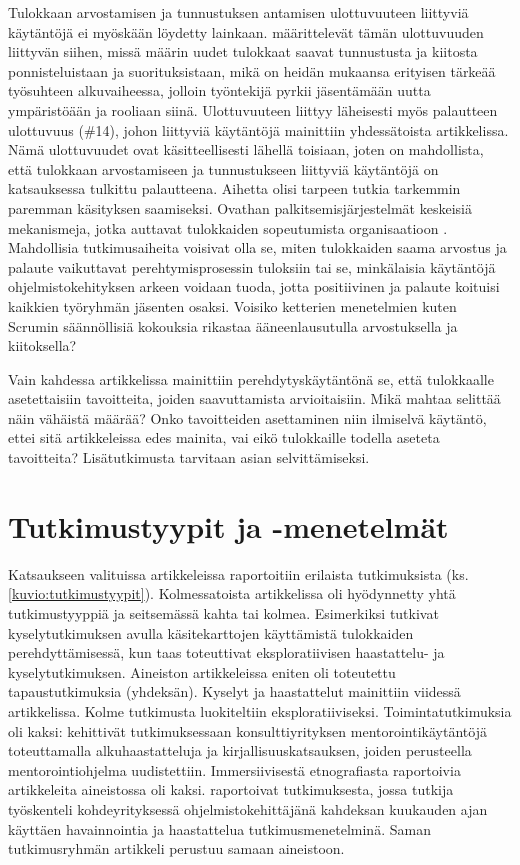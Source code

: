 \documentclass[utf8]{gradu3}
\begin{document}
Tulokkaan arvostamisen ja tunnustuksen antamisen ulottuvuuteen liittyviä käytäntöjä ei myöskään löydetty lainkaan. \textcite{wanberg-2012} määrittelevät tämän ulottuvuuden liittyvän siihen, missä määrin uudet tulokkaat saavat tunnustusta ja kiitosta ponnisteluistaan ja suorituksistaan, mikä on heidän mukaansa erityisen tärkeää työsuhteen alkuvaiheessa, jolloin työntekijä pyrkii jäsentämään uutta ympäristöään ja rooliaan siinä. Ulottuvuuteen liittyy läheisesti myös palautteen ulottuvuus (\#14), johon liittyviä käytäntöjä mainittiin yhdessätoista artikkelissa. Nämä ulottuvuudet ovat käsitteellisesti lähellä toisiaan, joten on mahdollista, että tulokkaan arvostamiseen ja tunnustukseen liittyviä käytäntöjä on katsauksessa tulkittu palautteena. Aihetta olisi tarpeen tutkia tarkemmin paremman käsityksen saamiseksi. Ovathan palkitsemisjärjestelmät keskeisiä mekanismeja, jotka auttavat tulokkaiden sopeutumista organisaatioon \parencite{jokisaari-nurmi-2009}. Mahdollisia tutkimusaiheita voisivat olla se, miten tulokkaiden saama arvostus ja palaute vaikuttavat perehtymisprosessin tuloksiin tai se, minkälaisia käytäntöjä ohjelmistokehityksen arkeen voidaan tuoda, jotta positiivinen ja palaute koituisi kaikkien työryhmän jäsenten osaksi. Voisiko ketterien menetelmien kuten Scrumin säännöllisiä kokouksia rikastaa ääneenlausutulla arvostuksella ja kiitoksella?

Vain kahdessa artikkelissa mainittiin perehdytyskäytäntönä se, että tulokkaalle asetettaisiin tavoitteita, joiden saavuttamista arvioitaisiin. Mikä mahtaa selittää näin vähäistä määrää? Onko tavoitteiden asettaminen niin ilmiselvä käytäntö, ettei sitä artikkeleissa edes mainita, vai eikö tulokkaille todella aseteta tavoitteita? Lisätutkimusta tarvitaan asian selvittämiseksi.

\section{Tutkimustyypit ja -menetelmät}
\label{luku-tutkimustyypit-ja-menetelmat}

Katsaukseen valituissa artikkeleissa raportoitiin erilaista tutkimuksista (ks. \ref{kuvio:tutkimustyypit}). Kolmessatoista artikkelissa oli hyödynnetty yhtä tutkimustyyppiä ja seitsemässä kahta tai kolmea. Esimerkiksi \textcite{azanza-ym-2021} tutkivat kyselytutkimuksen avulla käsitekarttojen käyttämistä tulokkaiden perehdyttämisessä, kun taas \textcite{pham-ym-2017} toteuttivat eksploratiivisen haastattelu- ja kyselytutkimuksen. Aineiston artikkeleissa eniten oli toteutettu tapaustutkimuksia (yhdeksän). Kyselyt ja haastattelut mainittiin viidessä artikkelissa. Kolme tutkimusta luokiteltiin eksploratiiviseksi. Toimintatutkimuksia oli kaksi: \textcite{bjornson-dingsøyr-2005} kehittivät tutkimuksessaan konsulttiyrityksen mentorointikäytäntöjä toteuttamalla alkuhaastatteluja ja kirjallisuuskatsauksen, joiden perusteella mentorointiohjelma uudistettiin. Immersiivisestä etnografiasta raportoivia artikkeleita aineistossa oli kaksi. \textcite{kumar-ym-2016} raportoivat tutkimuksesta, jossa tutkija työskenteli kohdeyrityksessä ohjelmistokehittäjänä kahdeksan kuukauden ajan käyttäen havainnointia ja haastattelua tutkimusmenetelminä. Saman tutkimusryhmän artikkeli \textcite{kumar-wallace-2019} perustuu samaan aineistoon. 
\end{document}
